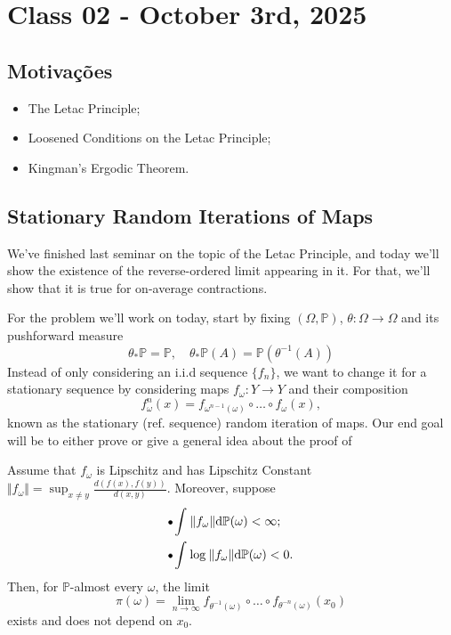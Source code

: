 \documentclass[../stationary_ifs.tex]{subfiles}
\begin{document}
\section{Class 02 - October 3rd, 2025}
\subsection{Motivações}
\begin{itemize}
	\item The Letac Principle;
	\item Loosened Conditions on the Letac Principle;
	\item Kingman's Ergodic Theorem.
\end{itemize}
\subsection{Stationary Random Iterations of Maps}
We've finished last seminar on the topic of the Letac Principle, and today we'll show the existence of the reverse-ordered limit
appearing in it. For that, we'll show that it is true for on-average contractions.

For the problem we'll work on today, start by fixing \((\Omega , \mathbb{P})\), \(\theta :\Omega \rightarrow \Omega \) and its pushforward measure
\[
	\theta_{*}\mathbb{P} = \mathbb{P}, \quad \theta_{*}\mathbb{P}(A) = \mathbb{P}(\theta^{-1}(A))
\]
Instead of only considering an i.i.d sequence \(\{f_{n}\}\), we want to change it for a stationary sequence by considering maps \(f_{\omega }:Y\rightarrow Y\) and their composition
\[
	f_{\omega }^{n}(x) = f_{\omega^{n-1}(\omega )}\circ \dotsc \circ f_{\omega }(x),
\]
known as the stationary (ref. sequence) random iteration of maps. Our end goal will be to either prove or give a general idea about the proof of
\hypertarget{letac_principle}{\begin{theorem*}
		Assume that \(f_{\omega }\) is Lipschitz and has Lipschitz Constant \(\Vert f_{\omega } \Vert=\sup_{x\neq y}\frac{d(f(x), f(y))}{d(x, y)}\). Moreover, suppose
		\begin{align*}
			 & \tikz[baseline=-0.5ex]\draw[black, fill=black, radius=1.5pt](0, 0)circle; \int_{}^{}\Vert f_{\omega } \Vert \mathrm{d}\mathbb{P}(\omega ) < \infty;     \\
			 & \tikz[baseline=-0.5ex]\draw[black, fill=black, radius=1.5pt](0, 0)circle; \int_{}^{}\log^{}{}\Vert f_{\omega } \Vert \mathrm{d}\mathbb{P}(\omega ) < 0.
		\end{align*}
		Then, for \(\mathbb{P}\)-almost every \(\omega \), the limit
		\[
			\pi (\omega ) = \lim_{n\to \infty}f_{\theta^{-1}(\omega )}\circ \dotsc \circ f_{\theta^{-n}(\omega )}(x_{0})
		\]
		exists and does not depend on \(x_{0}\).
	\end{theorem*}}
\end{document}
